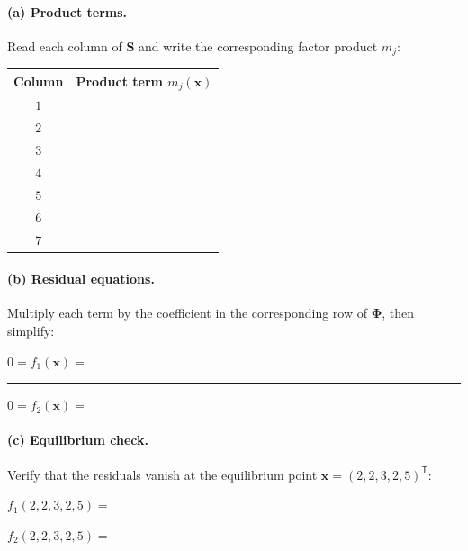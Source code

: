 \documentclass[10pt,a4paper]{article}
\begin{document}
\paragraph{(a) Product terms.} Read each column of $\mathbf{S}$ and write the
corresponding factor product $m_j$:
\par\vspace{3pt}
\begingroup
\renewcommand{\arraystretch}{1.8}
\begin{tabularx}{\textwidth}{@{}c X@{}}
\toprule
\textbf{Column} & \textbf{Product term $m_j(\mathbf x)$}\\
\midrule
$1$ & \\
$2$ & \\
$3$ & \\
$4$ & \\
$5$ & \\
$6$ & \\
$7$ & \\
\bottomrule
\end{tabularx}
\endgroup

\paragraph{(b) Residual equations.} Multiply each term by the coefficient in
the corresponding row of $\boldsymbol{\Phi}$, then simplify:
\vspace{2pt}
\par\noindent $0=f_1(\mathbf x)=$~\hrulefill
\par\vspace{14pt}\noindent\rule{\textwidth}{0.4pt}
\par\vspace{18pt}
\par\noindent $0=f_2(\mathbf x)=$~\hrulefill
\vspace{18pt}

\paragraph{(c) Equilibrium check.} Verify that the residuals vanish at the
equilibrium point $\mathbf x=(2,2,3,2,5)^\mathsf T$:
\vspace{2pt}
\par\noindent $f_1(2,2,3,2,5)=$~\hrulefill
\vspace{14pt}
\par\noindent $f_2(2,2,3,2,5)=$~\hrulefill
\vspace{14pt}

\newpage
\end{document}
